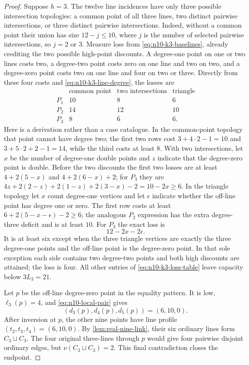 \begin{proof}
Suppose $h=3$.  The twelve line incidences have only three possible
intersection topologies: a common point of all three lines, two distinct
pairwise intersections, or three distinct pairwise intersections.  Indeed,
without a common point their union has size $12-j\le10$, where $j$ is the
number of selected pairwise intersections, so $j=2$ or $3$.
Measure loss from \eqref{eq:n10-k3-baselines}, already crediting the two
possible high-point discounts.  A degree-one point on one or two lines
costs two, a degree-two point costs zero on one line and two on two, and a
degree-zero point costs two on one line and four on two or three.  Directly
from these four costs and \eqref{eq:n10-k3-line-degree}, the losses are
\begin{equation}\label{eq:n10-k3-loss-table}
\begin{array}{c|ccc}
&\text{common point}&\text{two intersections}&\text{triangle}\\ \hline
P_1&10&8&6\\
P_2&14&12&10\\
P_3&8&6&6.
\end{array}
\end{equation}
Here is a derivation rather than a case catalogue.  In the common-point
topology that point cannot have degree two; the first two rows cost
$3+4\cdot2-1=10$ and $3+5\cdot2+2-1=14$, while the third costs at least
$8$.  With two intersections, let $x$ be the number of degree-one double
points and $z$ indicate that the degree-zero point is double.  Before the
two discounts the first two losses are at least
$4+2(5-x)$ and $4+2(6-x)+2$; for $P_3$ they are
$4z+2(2-z)+2(1-z)+2(3-x)-2=10-2x\ge6$.
In the triangle topology let $x$ count degree-one vertices and let
$\epsilon$ indicate whether the off-line point has degree one or zero.
The first row costs at least $6+2(5-x-\epsilon)-2\ge6$; the analogous
$P_2$ expression has the extra degree-three deficit and is at least $10$.
For $P_3$ the exact loss is
\begin{equation}\label{eq:n10-k3-P3-loss}
 12-2x-2\epsilon.
\end{equation}
It is at least six except when the three triangle vertices are exactly the
three degree-one points and the off-line point is the degree-zero point.
In that sole exception each side contains two degree-two points and both
high discounts are attained; the loss is four.  All other entries of
\eqref{eq:n10-k3-loss-table} leave capacity below $3L_3=21$.

Let $p$ be the off-line degree-zero point in the equality pattern.  It is
low, $\ell_3(p)=4$, and \eqref{eq:n10-local-pair} gives
\[
 (d_3(p),d_4(p),d_5(p))=(6,10,0).
\]
After inversion at $p$, the other nine points have line profile
$(t_2,t_3,t_4)=(6,10,0)$.  By \cref{lem:real-nine-link}, their six ordinary
lines form $C_3\sqcup C_3$.  The four original three-lines through $p$
would give four pairwise disjoint ordinary edges, but
$\nu(C_3\sqcup C_3)=2$.  This final contradiction closes the endpoint.
\end{proof}

